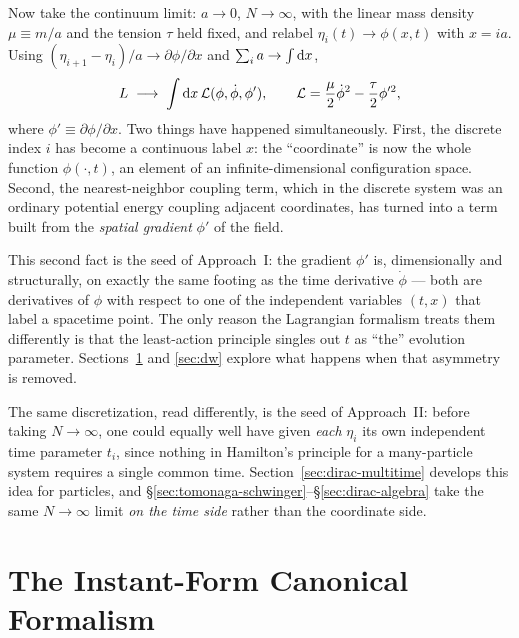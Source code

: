 Now take the continuum limit: $a\to0$, $N\to\infty$, with the linear mass
density $\mu \equiv m/a$ and the tension $\tau$ held fixed, and relabel
$\eta_i(t)\to \phi(x,t)$ with $x=ia$. Using $(\eta_{i+1}-\eta_i)/a \to
\partial\phi/\partial x$ and $\sum_i a \to \int \mathrm{d} x$,
\begin{equation}
L \;\longrightarrow\; \int \mathrm{d} x\, \mathcal{L}(\phi,\dot\phi,\phi'), \qquad
\mathcal{L} = \frac{\mu}{2}\dot\phi^2 - \frac{\tau}{2}\phi'^2 ,
\label{eq:string-lagrangian}
\end{equation}
where $\phi'\equiv\partial\phi/\partial x$. Two things have happened
simultaneously. First, the discrete index $i$ has become a continuous label
$x$: the ``coordinate'' is now the whole function $\phi(\cdot,t)$, an element
of an infinite-dimensional configuration space. Second, the nearest-neighbor
coupling term, which in the discrete system was an ordinary potential energy
coupling adjacent coordinates, has turned into a term built from the
\emph{spatial gradient} $\phi'$ of the field.

This second fact is the seed of Approach~I: the gradient $\phi'$ is,
dimensionally and structurally, on exactly the same footing as the time
derivative $\dot\phi$ --- both are derivatives of $\phi$ with respect to one of
the independent variables $(t,x)$ that label a spacetime point. The only reason
the Lagrangian formalism treats them differently is that the least-action
principle singles out $t$ as ``the'' evolution parameter.
Sections~\ref{sec:canonical} and \ref{sec:dw} explore what happens when that
asymmetry is removed.

The same discretization, read differently, is the seed of Approach~II: before
taking $N\to\infty$, one could equally well have given \emph{each} $\eta_i$ its
own independent time parameter $t_i$, since nothing in Hamilton's principle for
a many-particle system requires a single common time.
Section~\ref{sec:dirac-multitime} develops this idea for particles, and
\S\ref{sec:tomonaga-schwinger}--\S\ref{sec:dirac-algebra} take the same
$N\to\infty$ limit \emph{on the time side} rather than the coordinate side.

\section{The Instant-Form Canonical Formalism}
\label{sec:canonical}


